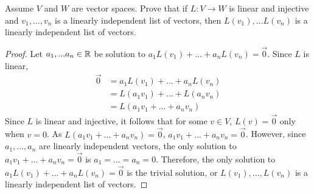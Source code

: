 \begin{question}
    \normalfont

    Assume $V$ and $W$ are vector spaces. Prove that if $L:V\to W$ is linear and injective and \hspace{.1cm} $v_1,\dots, v_n$ \hspace{.1cm} is a linearly independent list of vectors, then \hspace{.1cm} $L(v_1),\dots L(v_n)$  \hspace{.1cm} is a linearly independent list of vectors.
\end{question}

\begin{proof}
    \renewcommand{\qedsymbol}{$\blacksquare$}
    Let $a_1,...a_n\in\mathbb R$ be solution to $a_1L(v_1)+...+a_nL(v_n)=\vec{0}$. Since $L$ is linear,
    \[
        \begin{aligned}
            \vec{0} & = a_1L(v_1)+...+a_nL(v_n) \\
                    & = L(a_1v_1)+...+L(a_nv_n) \\
                    & = L(a_1v_1+...+a_nv_n)
        \end{aligned}
    \]
    Since $L$ is linear and injective, it follows that for some $v\in V$, $L(v)=\vec{0}$ only when $v=0$. As $L(a_1v_1+...+a_nv_n)=\vec{0}$, $a_1v_1+...+a_nv_n=\vec{0}$.
    However, since $a_1,...,a_n$ are linearly independent vectors, the only solution to $a_1v_1+...+a_nv_n=\vec{0}$ is $a_1=...=a_n=0$.
    Therefore, the only solution to $a_1L(v_1)+...+a_nL(v_n)=\vec{0}$ is the trivial solution, or $L(v_1),...,L(v_n)$ is a linearly independent list of vectors.
\end{proof}